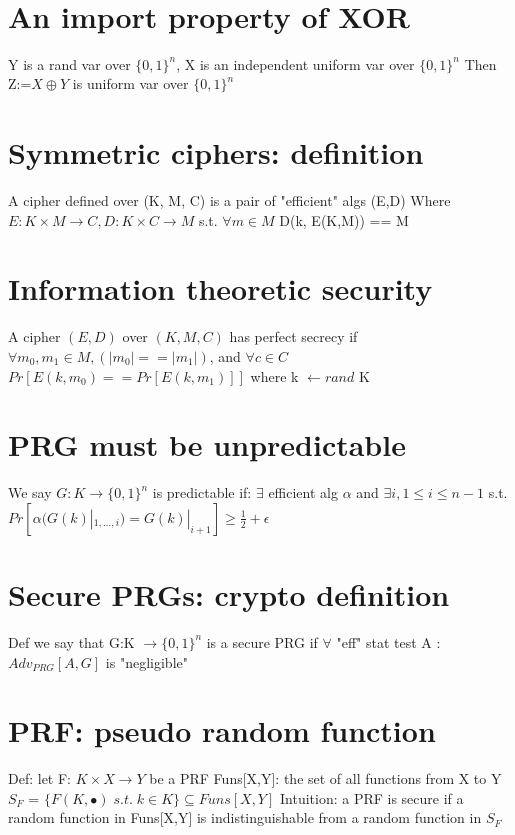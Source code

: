 \documentclass{article}
\begin{document}
\


\section{An import property of XOR}
Y is a  rand var over $\{0,1\}^n$, X is an independent uniform var over $\{0,1\}^n$
Then Z:=$X \oplus Y$ is uniform var over  $\{0,1\}^n$ 

\section{Symmetric ciphers:  definition}
A cipher defined over (K, M, C) is a pair of "efficient" algs (E,D)
Where $E: K \times M\rightarrow C, D: K \times C \rightarrow M$
s.t. $\forall m \in M$ D(k, E(K,M)) == M

\section{Information theoretic security}
A cipher $\left(E,D\right)$ over $\left(K, M, C\right)$ has perfect secrecy if 
$\forall m_0, m_1 \in M, \left(|m_0|==|m_1|\right)$, and $\forall c \in C$
$Pr[E(k,m_0)==Pr[E(k,m_1)]]$ where k $\leftarrow rand$ K

\section{PRG must be unpredictable}
We say $ G:K \rightarrow \{0,1\}^n $ is predictable if:
$\exists$ efficient alg $\alpha$ and $\exists i , 1\leq i \leq n-1$  s.t.
$Pr[\alpha(G(k)|_{1,...,i}) = G(k)|_{i+1}] \geq \frac{1}{2} + \epsilon$

\section{Secure PRGs: crypto definition}
Def we say that G:K $\rightarrow \{0,1\}^n$ is a secure PRG if
$\forall$ "eff" stat test A : $Adv_{PRG}[A,G]$ is "negligible"

\section{PRF: pseudo random function}
Def: let F: $K\times X\rightarrow Y$ be a PRF
Funs[X,Y]: the set of all functions from X to Y
$S_F$ = $\{F(K,\bullet)\;s.t.\;k\in K\} \subseteq Funs[X,Y]$ \newline
Intuition: a PRF is secure if
a random function in Funs[X,Y] is indistinguishable from a random function in $S_F$
\end{document}
